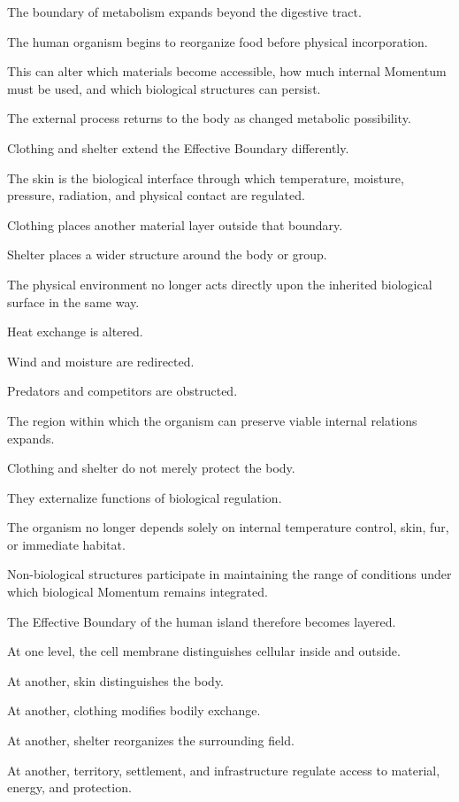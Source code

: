 The boundary of metabolism expands beyond the digestive tract.

The human organism begins to reorganize food before physical incorporation.

This can alter which materials become accessible, how much internal Momentum must be used, and which biological structures can persist.

The external process returns to the body as changed metabolic possibility.

Clothing and shelter extend the Effective Boundary differently.

The skin is the biological interface through which temperature, moisture, pressure, radiation, and physical contact are regulated.

Clothing places another material layer outside that boundary.

Shelter places a wider structure around the body or group.

The physical environment no longer acts directly upon the inherited biological surface in the same way.

Heat exchange is altered.

Wind and moisture are redirected.

Predators and competitors are obstructed.

The region within which the organism can preserve viable internal relations expands.

Clothing and shelter do not merely protect the body.

They externalize functions of biological regulation.

The organism no longer depends solely on internal temperature control, skin, fur, or immediate habitat.

Non-biological structures participate in maintaining the range of conditions under which biological Momentum remains integrated.

The Effective Boundary of the human island therefore becomes layered.

At one level, the cell membrane distinguishes cellular inside and outside.

At another, skin distinguishes the body.

At another, clothing modifies bodily exchange.

At another, shelter reorganizes the surrounding field.

At another, territory, settlement, and infrastructure regulate access to material, energy, and protection.

